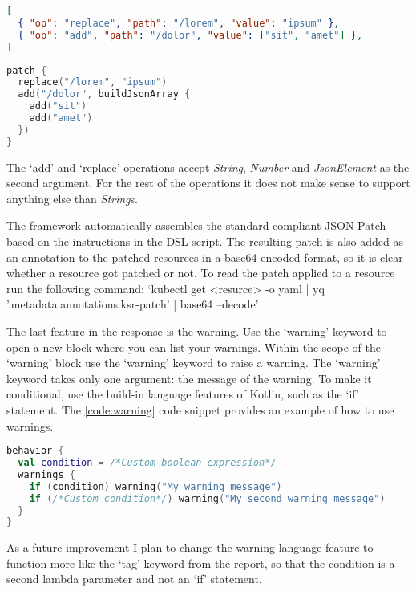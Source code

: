 \begin{lstlisting}[caption={JSON Patch example},language=JSON,label=code:json_patch_1]
[
  { "op": "replace", "path": "/lorem", "value": "ipsum" },
  { "op": "add", "path": "/dolor", "value": ["sit", "amet"] },
]
\end{lstlisting}

\begin{lstlisting}[caption={JSON Patch using DSL},language=Kotlin,label=code:json_patch_2]
patch {
  replace("/lorem", "ipsum")
  add("/dolor", buildJsonArray {
    add("sit")
    add("amet")
  })
}
\end{lstlisting}

The `add' and `replace' operations accept \emph{String}, \emph{Number} and \emph{JsonElement} as the second argument. For the rest of the operations it does not make sense to support anything else than \emph{String}s.

The framework automatically assembles the standard compliant JSON Patch based on the instructions in the DSL script. The resulting patch is also added as an annotation to the patched resources in a base64 encoded format, so it is clear whether a resource got patched or not. To read the patch applied to a resource run the following command: `kubectl get <resurce> -o yaml | yq '.metadata.annotations.ksr-patch' | base64 --decode'

The last feature in the response is the warning. Use the `warning' keyword to open a new block where you can list your warnings. Within the scope of the `warning' block use the `warning' keyword to raise a warning. The `warning' keyword takes only one argument: the message of the warning. To make it conditional, use the build-in language features of Kotlin, such as the `if' statement. The \ref{code:warning} code snippet provides an example of how to use warnings.

\begin{lstlisting}[caption={JSON Patch using DSL},language=Kotlin,label=code:warning]
behavior {
  val condition = /*Custom boolean expression*/
  warnings {
    if (condition) warning("My warning message")
    if (/*Custom condition*/) warning("My second warning message")
  }
}
\end{lstlisting}

As a future improvement I plan to change the warning language feature to function more like the `tag' keyword from the report, so that the condition is a second lambda parameter and not an `if' statement.
